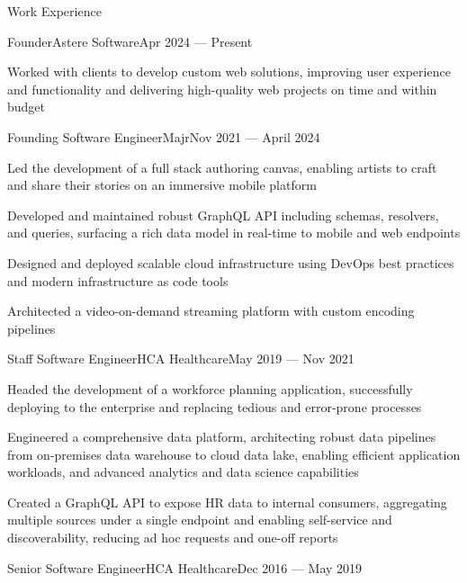 \documentclass{resume} %
\begin{document}
  \begin{rSection}{Work Experience}

      \begin{rWorkHistoryItem}{Founder}{Astere Software}{Apr 2024 --- Present}
          \item Worked with clients to develop custom web solutions, improving user experience and functionality and delivering high-quality web projects on time and within budget
      \end{rWorkHistoryItem}
      \begin{rWorkHistoryItem}{Founding Software Engineer}{Majr}{Nov 2021 --- April 2024}
          \item Led the development of a full stack authoring canvas, enabling artists to craft and share their stories on an immersive mobile platform
          \item Developed and maintained robust GraphQL API including schemas, resolvers, and queries, surfacing a rich data model in real-time to mobile and web endpoints
          \item Designed and deployed scalable cloud infrastructure using DevOps best practices and modern infrastructure as code tools
          \item Architected a video-on-demand streaming platform with custom encoding pipelines
      \end{rWorkHistoryItem}
      \begin{rWorkHistoryItem}{Staff Software Engineer}{HCA Healthcare}{May 2019 --- Nov 2021}
          \item Headed the development of a workforce planning application, successfully deploying to the enterprise and replacing tedious and error-prone processes
          \item Engineered a comprehensive data platform, architecting robust data pipelines from on-premises data warehouse to cloud data lake, enabling efficient application workloads, and advanced analytics and data science capabilities
          \item Created a GraphQL API to expose HR data to internal consumers, aggregating multiple sources under a single endpoint and enabling self-service and discoverability, reducing ad hoc requests and one-off reports
      \end{rWorkHistoryItem}
      \begin{rWorkHistoryItem}{Senior Software Engineer}{HCA Healthcare}{Dec 2016 --- May 2019}

\end{rWorkHistoryItem}
\end{rSection}
\end{document}
